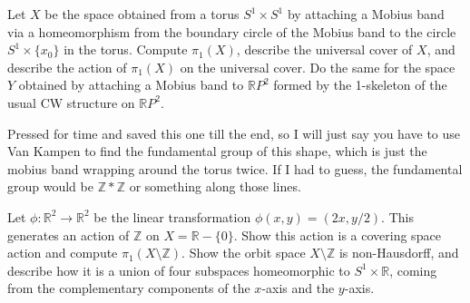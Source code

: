 \documentclass[12pt]{article}
\begin{document}
\begin{statement}
  Let $X$ be the space obtained from a torus $S^1 \times S^1$ by attaching a Mobius band via a 
  homeomorphism from the boundary circle of the Mobius band to the circle $S^1 \times \{x_0\}$ 
  in the torus. Compute $\pi_1(X)$, describe the universal cover of $X$, and describe the action 
  of $\pi_1(X)$ on the universal cover. Do the same for the space $Y$ obtained by attaching 
  a Mobius band to $\mathbb{R}P^2$ formed by the 1-skeleton of the usual CW structure on $\mathbb{R}P^2$. 
\end{statement}

\begin{newproof}
  Pressed for time and saved this one till the end, so I will just say you have to use Van Kampen 
  to find the fundamental group of this shape, which is just the mobius band wrapping around the 
  torus twice. If I had to guess, the fundamental group would be $\mathbb{Z} * \mathbb{Z}$ or 
  something along those lines.
\end{newproof}

\begin{statement}
  Let $\phi: \mathbb{R}^2 \to \mathbb{R}^2$ be the linear transformation $\phi(x,y)=(2x,y/2)$. This generates 
  an action of $\mathbb{Z}$ on $X = \mathbb{R} - \{0\}$. Show this action is a covering space action and 
  compute $\pi_1(X \setminus \mathbb{Z})$. Show the orbit space $X \setminus \mathbb{Z}$ is 
  non-Hausdorff, and describe how it is a union of four subspaces homeomorphic to $S^1 \times \mathbb{R}$, coming 
  from the complementary components of the $x$-axis and the $y$-axis. 
\end{statement}
\end{document}
